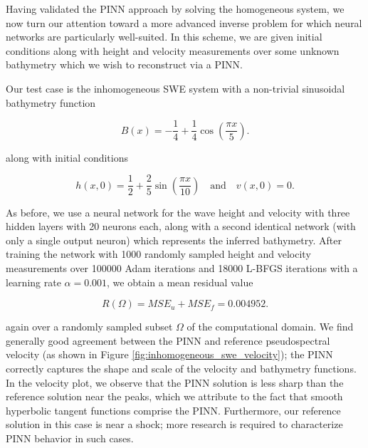 Having validated the PINN approach by solving the homogeneous system, we now turn our attention toward a more advanced
inverse problem for which neural networks are particularly well-suited. In this scheme, we are given initial conditions 
along with height and velocity measurements over some unknown bathymetry which we wish to reconstruct via a PINN. 

Our test case is the inhomogeneous SWE system with a non-trivial sinusoidal bathymetry function

$$
B(x) = -\frac{1}{4} + \frac{1}{4} \cos{\left( \frac{\pi x}{5} \right)}.
$$

\noindent along with initial conditions

$$
h(x, 0) = \frac{1}{2} + \frac{2}{5} \sin{\left( \frac{\pi x}{10} \right)} \quad \text{and} \quad v(x, 0) = 0.
$$

As before, we use a neural network for the wave height and velocity with three hidden layers with 20 neurons each, along
with a second identical network (with only a single output neuron) which represents the inferred bathymetry. After 
training the network with 1000 randomly sampled height and velocity measurements over 100000 Adam iterations and 18000 
L-BFGS iterations with a learning rate $\alpha = 0.001$, we obtain a mean residual value

$$
R(\Omega) = MSE_u + MSE_f = 0.004952.
$$

\noindent again over a randomly sampled subset $\Omega$ of the computational domain. We find generally good agreement 
between the PINN and reference pseudospectral velocity (as shown in Figure \ref*{fig:inhomogeneous_swe_velocity}); the
PINN correctly captures the shape and scale of the velocity and bathymetry functions. In the velocity plot, we observe
that the PINN solution is less sharp than the reference solution near the peaks, which we attribute to the fact that 
smooth hyperbolic tangent functions comprise the PINN. Furthermore, our reference solution in this case is near a shock; 
more research is required to characterize PINN behavior in such cases.


